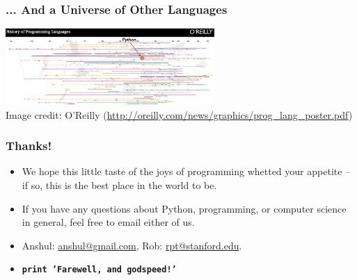 \documentclass[10pt]{beamer}
\begin{document}
\begin{frame}
  \frametitle{... And a Universe of Other Languages}
  \begin{center}
    \includegraphics[width=300px]{ProgrammingLanguagesPoster-AnnotatedCropped.png} \\
    \tiny 
    Image credit: O'Reilly (\href{http://oreilly.com/news/graphics/prog\_lang\_poster.pdf}{http://oreilly.com/news/graphics/prog\_lang\_poster.pdf})
  \end{center}
\end{frame}

\begin{frame}
  \frametitle{Thanks!}
  \begin{itemize}
    \item We hope this little taste of the joys of programming whetted your appetite -- if so, this is the best place in the world to be.
    \item If you have any questions about Python, programming, or computer science in general, feel free to email either of us.
    \item Anshul: \href{mailto:nigham@gmail.com}{anshul@gmail.com}, Rob: \href{mailto:rpt@stanford.edu}{rpt@stanford.edu}.
    \item \texttt{\textbf{print 'Farewell, and godspeed!'}}
  \end{itemize}
\end{frame}
\end{document}
